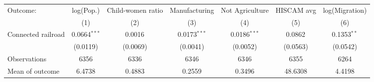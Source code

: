 \begin{tabular}{lcccccc}
  \toprule
  Outcome: & log(Pop.) & Child-women ratio & Manufacturing & Not Agriculture & HISCAM avg & log(Migration) \\
           & (1) & (2) & (3) & (4) & (5) & (6) \\
  \midrule
  Connected railroad &  0.0664$^{***}$ & 0.0016$^{}$ & 0.0173$^{***}$ & 0.0186$^{***}$ & 0.0862$^{}$ & 0.1353$^{**}$  \\
                    &  (0.0119) & (0.0069) & (0.0041) & (0.0052) & (0.0563) & (0.0542)  \\
  \cmidrule(lr){2-7}
  Observations      &  6356 & 6336 & 6346 & 6346 & 6355 & 6264  \\
  Mean of outcome   &  6.4738 & 0.4883 & 0.2559 & 0.3496 & 48.6308 & 4.4198  \\
  \bottomrule
\end{tabular}
